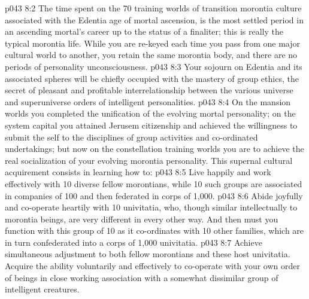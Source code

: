 \vs p043 8:2 The time spent on the 70 training worlds of transition morontia culture associated with the Edentia age of mortal ascension, is the most settled period in an ascending mortal’s career up to the status of a finaliter; this is really the typical morontia life. While you are re\hyp{}keyed each time you pass from one major cultural world to another, you retain the same morontia body, and there are no periods of personality unconsciousness.
\vs p043 8:3 Your sojourn on Edentia and its associated spheres will be chiefly occupied with the mastery of group ethics, the secret of pleasant and profitable interrelationship between the various universe and superuniverse orders of intelligent personalities.
\vs p043 8:4 On the mansion worlds you completed the unification of the evolving mortal personality; on the system capital you attained Jerusem citizenship and achieved the willingness to submit the self to the disciplines of group activities and co\hyp{}ordinated undertakings; but now on the constellation training worlds you are to achieve the real socialization of your evolving morontia personality. This supernal cultural acquirement consists in learning how to:
\vs p043 8:5 \bibnobreakspace Live happily and work effectively with 10 diverse fellow morontians, while 10 such groups are associated in companies of 100 and then federated in corps of 1,000.
\vs p043 8:6 \bibnobreakspace Abide joyfully and co\hyp{}operate heartily with 10 univitatia, who, though similar intellectually to morontia beings, are very different in every other way. And then must you function with this group of 10 as it co\hyp{}ordinates with 10 other families, which are in turn confederated into a corps of 1,000 univitatia.
\vs p043 8:7 \bibnobreakspace Achieve simultaneous adjustment to both fellow morontians and these host univitatia. Acquire the ability voluntarily and effectively to co\hyp{}operate with your own order of beings in close working association with a somewhat dissimilar group of intelligent creatures.
